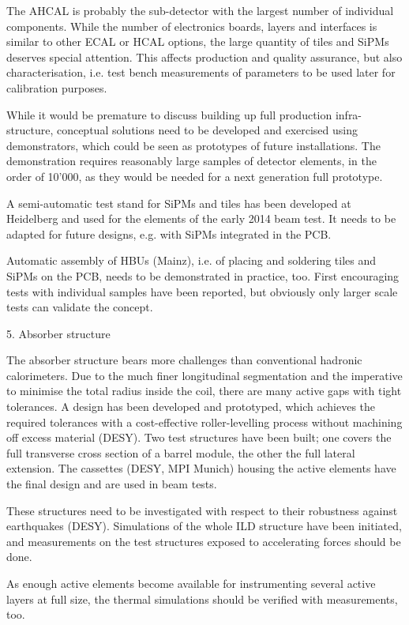 The AHCAL is probably the sub-detector with the largest number of individual components. While the number of electronics boards, layers and interfaces is similar to other ECAL or HCAL options, the large quantity of tiles and SiPMs deserves special attention. This affects production and quality assurance, but also characterisation, i.e. test bench measurements of parameters to be used later for calibration purposes.  

While it would be premature to discuss building up full production infra-structure, conceptual solutions need to be developed and exercised using demonstrators, which could be seen as prototypes of future installations. The demonstration requires reasonably large samples of detector elements, in the order of 10’000, as they would be needed for a next generation full prototype. 

A semi-automatic test stand for SiPMs and tiles has been developed at Heidelberg and used for the elements of the early 2014 beam test. It needs to be adapted for future designs, e.g. with SiPMs integrated in the PCB. 

Automatic assembly of HBUs (Mainz), i.e. of placing and soldering tiles and SiPMs on the PCB, needs to be demonstrated in practice, too. First encouraging tests with individual samples have been reported, but obviously only larger scale tests can validate the concept. 

5.  Absorber structure

The absorber structure bears more challenges than conventional hadronic calorimeters. Due to the much finer longitudinal segmentation and the imperative to minimise the total radius inside the coil, there are many active gaps with tight tolerances. A design has been developed and prototyped, which achieves the required tolerances with a cost-effective roller-levelling process without machining off excess material (DESY). Two test structures have been built; one covers the full transverse cross section of a barrel module, the other the full lateral extension. The cassettes (DESY, MPI Munich) housing the active elements have the final design and are used in beam tests. 

These structures need to be investigated with respect to their robustness against earthquakes (DESY). Simulations of the whole ILD structure have been initiated, and measurements on the test structures exposed to accelerating forces should be done. 

As enough active elements become available for instrumenting several active layers at full size, the thermal simulations should be verified with measurements, too. 

